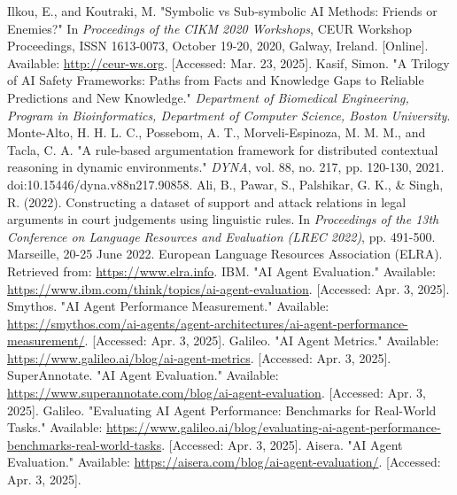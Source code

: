 \documentclass[conference]{IEEEtran}
\begin{document}
\begin{thebibliography}{00}
     Ilkou, E., and Koutraki, M. "Symbolic vs Sub-symbolic AI Methods: Friends or Enemies?" In \textit{Proceedings of the CIKM 2020 Workshops}, CEUR Workshop Proceedings, ISSN 1613-0073, October 19-20, 2020, Galway, Ireland. [Online]. Available: \url{http://ceur-ws.org}. [Accessed: Mar. 23, 2025].
     Kasif, Simon. "A Trilogy of AI Safety Frameworks: Paths from Facts and Knowledge Gaps to Reliable Predictions and New Knowledge." \textit{Department of Biomedical Engineering, Program in Bioinformatics, Department of Computer Science, Boston University}.
     Monte-Alto, H. H. L. C., Possebom, A. T., Morveli-Espinoza, M. M. M., and Tacla, C. A. "A rule-based argumentation framework for distributed contextual reasoning in dynamic environments." \textit{DYNA}, vol. 88, no. 217, pp. 120-130, 2021. doi:10.15446/dyna.v88n217.90858.
     Ali, B., Pawar, S., Palshikar, G. K., \& Singh, R. (2022). Constructing a dataset of support and attack relations in legal arguments in court judgements using linguistic rules. In \textit{Proceedings of the 13th Conference on Language Resources and Evaluation (LREC 2022)}, pp. 491-500. Marseille, 20-25 June 2022. European Language Resources Association (ELRA). Retrieved from: \url{https://www.elra.info}.
     IBM. "AI Agent Evaluation." Available: \url{https://www.ibm.com/think/topics/ai-agent-evaluation}. [Accessed: Apr. 3, 2025].
     Smythos. "AI Agent Performance Measurement." Available: \url{https://smythos.com/ai-agents/agent-architectures/ai-agent-performance-measurement/}. [Accessed: Apr. 3, 2025].
     Galileo. "AI Agent Metrics." Available: \url{https://www.galileo.ai/blog/ai-agent-metrics}. [Accessed: Apr. 3, 2025].
     SuperAnnotate. "AI Agent Evaluation." Available: \url{https://www.superannotate.com/blog/ai-agent-evaluation}. [Accessed: Apr. 3, 2025].
     Galileo. "Evaluating AI Agent Performance: Benchmarks for Real-World Tasks." Available: \url{https://www.galileo.ai/blog/evaluating-ai-agent-performance-benchmarks-real-world-tasks}. [Accessed: Apr. 3, 2025].
     Aisera. "AI Agent Evaluation." Available: \url{https://aisera.com/blog/ai-agent-evaluation/}. [Accessed: Apr. 3, 2025].
    \end{thebibliography}
    
\end{document}
